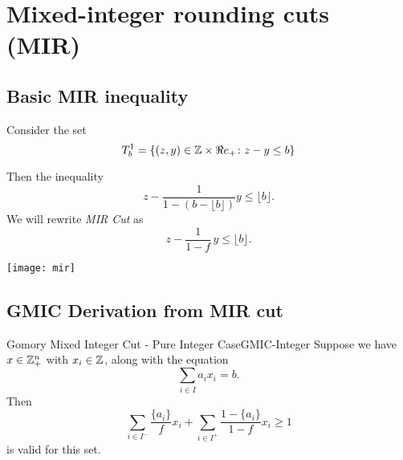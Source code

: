 \section{Mixed-integer rounding cuts (MIR)}
\subsection{Basic MIR inequality}\label{basicMIR}
%
\begin{multicols}{2}

Consider the set 
\begin{equation}
T^{1}_{b} = \{(z,y) \in {\mathbb{Z}} \times \Re e_{+} \colon z - y \leq b\}
\end{equation}

Then the inequality 
\begin{equation}
z - \frac{1}{1 - (b - \lfloor b \rfloor)} y \leq \lfloor b \rfloor.
\end{equation}
We will rewrite \emph{MIR Cut} as 
\begin{equation}
z - \frac{1}{1 - f}\, y \leq \lfloor b \rfloor.
\end{equation}

\columnbreak

\begin{center}
\texttt{[image: mir]}
\end{center}


\end{multicols}


\subsection{GMIC Derivation from MIR cut}
\begin{theorem}{Gomory Mixed Integer Cut - Pure Integer Case}{GMIC-Integer}
Suppose we have $x \in {\mathbb{Z}}^n_+$ with $x_i \in {\mathbb{Z}}$, along with the equation
\begin{equation}
\sum_{i \in I} a_{i}x_{i} = b.
\end{equation}
Then
\begin{equation}
\label{eq:gmic}
\sum_{i \in I^{-}} \frac{\{a_i\}}{f} x_i + \sum_{i \in I^+} \frac{1-\{a_i\}}{1-f}x_i \geq 1
\end{equation}
is valid for this set.
\end{theorem}



